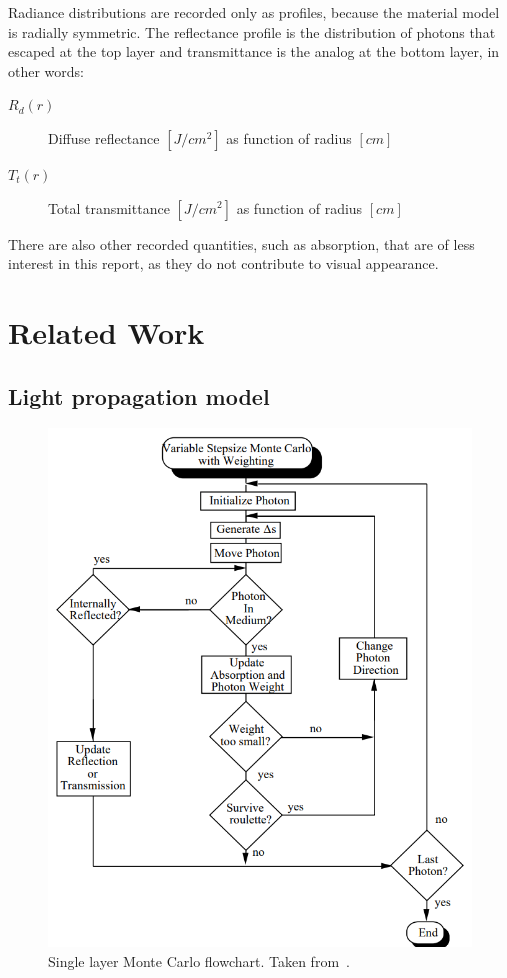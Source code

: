 \documentclass[]{article}
\begin{document}
Radiance distributions are recorded only as profiles, because the material model is radially symmetric. The reflectance profile is the distribution of photons that escaped at the top layer and transmittance is the analog at the bottom layer, in other words:

\begin{description}
	\item[$R_d(r)$] Diffuse reflectance $[J/cm^2]$ as function of radius $[cm]$
	\item[$T_t(r)$] Total transmittance $[J/cm^2]$ as function of radius $[cm]$
\end{description}

There are also other recorded quantities, such as absorption, that are of less interest in this report, as they do not contribute to visual appearance.

\section{Related Work}

\subsection{Light propagation model}

\begin{figure}[ht!]
	\includegraphics[width=\linewidth]{img/flowchart.png}
	\caption{Single layer Monte Carlo flowchart. Taken from~\cite{prahl89}.}
	\label{flowchart}
\end{figure}
\end{document}
